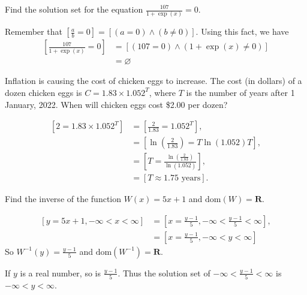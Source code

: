 \documentclass[12pt,fleqn,answers]{exam}
\newcommand{\reals}{\mathbf{R}}
\newcommand{\dom}{\mbox{dom}}
\begin{document}
\large


\vspace{0.1in}


\begin{questions} 

\question Find the solution set for the equation \( \frac{107}{1 + \exp(x)} = 0\).
\begin{solution}[1.0in]
Remember that $\left[\frac{a}{b}= 0\right] = [(a=0) \land (b \neq 0)]$. Using this fact,
we have
\begin{align*}
    \left[ \frac{107}{1 + \exp(x)} = 0 \right] &= \left[(107=0) \land (1 + \exp(x) \neq 0) \right] \\
             &= \varnothing
\end{align*}
\end{solution}

\question Inflation is causing the cost of chicken eggs to increase. The cost (in dollars) of a dozen chicken eggs is $C = 1.83 \times 1.052^T$, where $T$ is
the number of years after 1 January, 2022. When will chicken eggs cost \$2.00 per dozen?

\begin{solution}[1.0in]
\begin{align*}
    \left[2 = 1.83 \times 1.052^T\right] &= \left[\frac{2}{1.83}=1.052^T\right],\\
                                 &=\left[\ln\left(\frac{2}{1.83}\right)=T \ln(1.052)T\right],\\
                                 &=\left[T = \frac{\ln(\frac{2}{1.83})}{\ln(1.052)} \right],\\
                                 &= \left[T \approx 1.75 \mbox{ years}\right].
\end{align*}    
\end{solution}

\question Find the inverse of the function $W(x) = 5 x +1$ and $\dom(W) = \reals$.
\begin{solution}[3.0in]
\begin{align*}
    \left[ y = 5 x + 1, -\infty < x < \infty \right] &= \left[x = \frac{y-1}{5},  -\infty < \frac{y-1}{5} < \infty \right], \\
               &= \left[x = \frac{y-1}{5},  -\infty < y < \infty \right]
\end{align*}
So $W^{-1}(y) = \frac{y-1}{5}$ and $\dom(W^{-1}) = \reals$.

If $y$ is a real number, so is $\frac{y-1}{5}$. Thus the solution set of
\(-\infty < \frac{y-1}{5} < \infty \) is \\ \mbox{\(-\infty < y < \infty\).}


\end{solution}
\end{questions}
\end{document}
